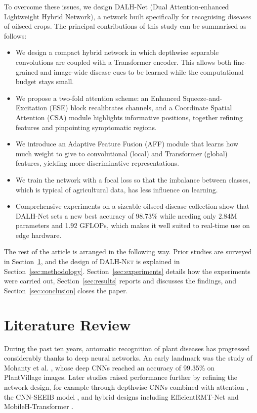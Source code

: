 \documentclass[default, iicol]{sn-jnl}
\theoremstyle{thmstyleone}%
\theoremstyle{thmstyletwo}%
\theoremstyle{thmstylethree}%
\newcommand{\dalh}{\textsc{DALH-Net}}
\begin{document}
To overcome these issues, we design DALH-Net (Dual Attention-enhanced Lightweight Hybrid Network), a network built specifically for recognising diseases of oilseed crops. The principal contributions of this study can be summarised as follows:

\begin{itemize}

\item We design a compact hybrid network in which depthwise separable convolutions are coupled with a Transformer encoder. This allows both fine-grained and image-wide disease cues to be learned while the computational budget stays small.

\item We propose a two-fold attention scheme: an Enhanced Squeeze-and-Excitation (ESE) block recalibrates channels, and a Coordinate Spatial Attention (CSA) module highlights informative positions, together refining features and pinpointing symptomatic regions.

\item We introduce an Adaptive Feature Fusion (AFF) module that learns how much weight to give to convolutional (local) and Transformer (global) features, yielding more discriminative representations.

\item We train the network with a focal loss so that the imbalance between classes, which is typical of agricultural data, has less influence on learning.

\item Comprehensive experiments on a sizeable oilseed disease collection show that DALH-Net sets a new best accuracy of 98.73\% while needing only 2.84M parameters and 1.92 GFLOPs, which makes it well suited to real-time use on edge hardware.

\end{itemize}
The rest of the article is arranged in the following way. Prior studies are surveyed in Section~\ref{sec:related}, and the design of \dalh{} is explained in Section~\ref{sec:methodology}. Section~\ref{sec:experiments} details how the experiments were carried out, Section~\ref{sec:results} reports and discusses the findings, and Section~\ref{sec:conclusion} closes the paper.
\section{Literature Review}\label{sec:related}

During the past ten years, automatic recognition of plant diseases has progressed considerably thanks to deep neural networks. An early landmark was the study of Mohanty et al. \cite{mohanty2016using}, whose deep CNNs reached an accuracy of 99.35\% on PlantVillage images. Later studies raised performance further by refining the network design, for example through depthwise CNNs combined with attention \cite{ashurov2025enhancing}, the CNN-SEEIB model \cite{karthikeyan2025enhanced}, and hybrid designs including EfficientRMT-Net \cite{shaheed2023efficientrmtnet} and MobileH-Transformer \cite{thai2025mobileh}.
\end{document}
